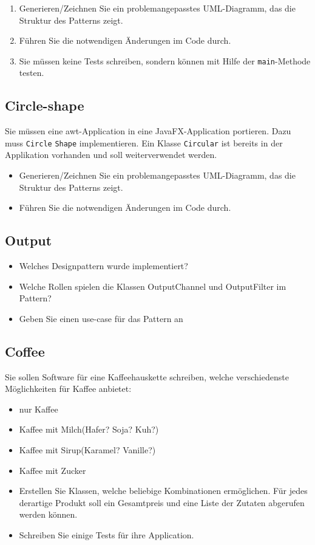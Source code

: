 \begin{enumerate}
	\item Generieren/Zeichnen Sie ein problemangepasstes UML-Diagramm, das die Struktur des Patterns zeigt.
	\item Führen Sie die notwendigen Änderungen im Code durch. 
	\item Sie müssen keine Tests schreiben, sondern können mit Hilfe der \texttt{main}-Methode testen. 
\end{enumerate}

\subsection{Circle-shape}
Sie müssen eine awt-Application in eine JavaFX-Application portieren. Dazu muss \texttt{Circle} \texttt{Shape} implementieren. Ein Klasse \texttt{Circular} ist bereits in der Applikation vorhanden und soll weiterverwendet werden.
\begin{itemize}
	\item Generieren/Zeichnen Sie ein problemangepasstes UML-Diagramm, das die Struktur des Patterns zeigt.
	\item Führen Sie die notwendigen Änderungen im Code durch. 
\end{itemize}

\subsection{Output}
\begin{itemize}
	\item Welches Designpattern wurde implementiert?
	\item Welche Rollen spielen die Klassen OutputChannel und OutputFilter im Pattern?
	\item Geben Sie einen use-case für das Pattern an
\end{itemize}

\subsection{Coffee}
	Sie sollen Software für eine Kaffeehauskette schreiben, welche verschiedenste Möglichkeiten für Kaffee anbietet:
	\begin{itemize}
		\item nur Kaffee
		\item Kaffee mit Milch(Hafer? Soja? Kuh?)
		\item Kaffee mit Sirup(Karamel? Vanille?)
		\item Kaffee mit Zucker
	\end{itemize}
\begin{itemize}
	\item Erstellen Sie Klassen, welche beliebige Kombinationen ermöglichen. Für jedes derartige Produkt soll ein Gesamtpreis und eine Liste der Zutaten abgerufen werden können.
	\item Schreiben Sie einige Tests für ihre Application. 
\end{itemize}

